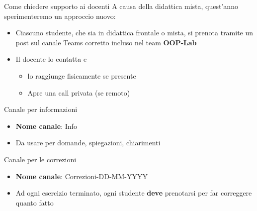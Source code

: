 \documentclass[presentation]{beamer}
\begin{document}
\begin{frame}{Come chiedere supporto ai docenti}
    A causa della didattica mista, quest'anno sperimenteremo un approccio nuovo:
    \begin{itemize}
        \item Ciascuno studente, che sia in didattica frontale o mista, si prenota tramite un post sul canale Teams corretto incluso nel team \textbf{OOP-Lab}
        \item Il docente lo contatta e
        \begin{itemize}
            \item lo raggiunge fisicamente se presente
            \item Apre una call privata (se remoto)
        \end{itemize}
    \end{itemize}
    \begin{block}{Canale per informazioni}
        \begin{itemize}
            \item \textbf{Nome canale}: Info
            \item Da usare per domande, spiegazioni, chiarimenti
        \end{itemize}
    \end{block}
    \begin{block}{Canale per le correzioni}
        \begin{itemize}
            \item \textbf{Nome canale}: Correzioni-DD-MM-YYYY
            \item Ad ogni esercizio terminato, ogni studente \textbf{deve} prenotarsi per far correggere quanto fatto
        \end{itemize}
    \end{block}
\end{frame}
\end{document}
